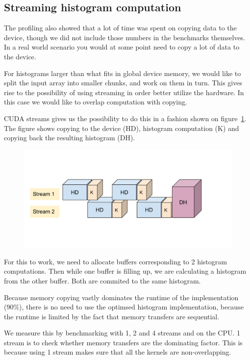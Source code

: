 \documentclass[12pt, a4paper, hidelinks]{article}
\begin{document}
\subsection{Streaming histogram computation}
The profiling also showed that a lot of time was spent on copying data to the device,
though we did not include those numbers in the benchmarks themselves. In a real
world scenario you would at some point need to copy a lot of data to the device.

For histograms larger than what fits in global device memory, we would like to split
the input array into smaller chunks, and work on them in turn.
This gives rise to the possibility of using streaming in order better utilize the hardware.
In this case we would like to overlap computation with copying.

CUDA streams gives us the possibility to do this in a fashion shown on figure~\ref{fig:cuda-stream}.
The figure shows copying to the device (HD),
histogram computation (K) and copying back the resulting histogram (DH).

\begin{figure}[htpb]
    \centering
    \includegraphics[width=0.8\linewidth]{img/cuda-stream.pdf}
    \label{fig:cuda-stream}
\end{figure}

For this to work, we need to allocate buffers corresponding to 2 histogram computations.
Then while one buffer is filling up, we are calculating a histogram from the other
buffer. Both are commited to the same histogram.

Because memory copying vastly dominates the runtime of the implementation (90\%),
there is no need to use the optimsed histogram implementation, because the runtime
is limited by the fact that memory transfers are sequential.

We measure this by benchmarking with 1, 2 and 4 streams and on the CPU. 1 stream
is to check whether memory transfers are the dominating factor. This is because
using 1 stream makes sure that all the kernels are non-overlapping.
\end{document}
